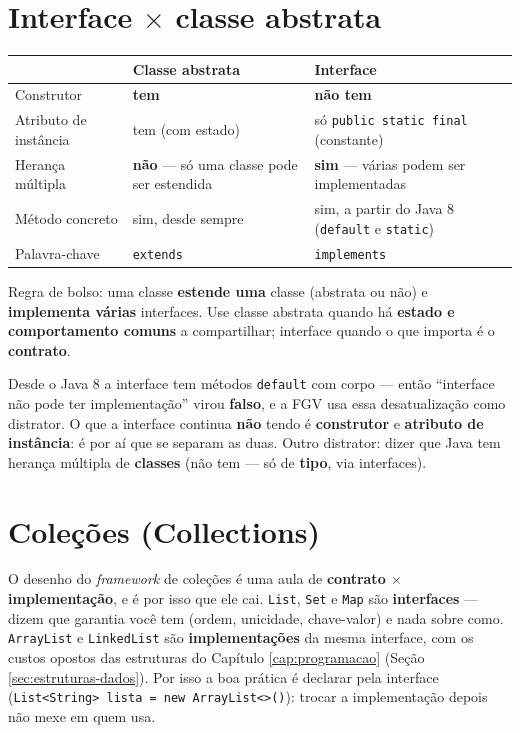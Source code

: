 \section{Interface $\times$ classe abstrata}

\begin{center}
\begin{tabular}{@{}p{3.2cm}p{4.2cm}p{4.2cm}@{}}
\toprule
& \textbf{Classe abstrata} & \textbf{Interface} \\
\midrule
Construtor & \textbf{tem} & \textbf{não tem} \\
Atributo de instância & tem (com estado) & só \texttt{public static final} (constante) \\
Herança múltipla & \textbf{não} --- só uma classe pode ser estendida & \textbf{sim} --- várias podem ser implementadas \\
Método concreto & sim, desde sempre & sim, a partir do Java 8 (\texttt{default} e \texttt{static}) \\
Palavra-chave & \texttt{extends} & \texttt{implements} \\
\bottomrule
\end{tabular}
\end{center}

Regra de bolso: uma classe \textbf{estende uma} classe (abstrata ou não) e
\textbf{implementa várias} interfaces. Use classe abstrata quando há
\textbf{estado e comportamento comuns} a compartilhar; interface quando o que
importa é o \textbf{contrato}.

\begin{pegadinha}
Desde o Java 8 a interface tem métodos \texttt{default} com corpo --- então
``interface não pode ter implementação'' virou \textbf{falso}, e a FGV usa
essa desatualização como distrator. O que a interface continua \textbf{não}
tendo é \textbf{construtor} e \textbf{atributo de instância}: é por aí que se
separam as duas. Outro distrator: dizer que Java tem herança múltipla de
\textbf{classes} (não tem --- só de \textbf{tipo}, via interfaces).
\end{pegadinha}

\section{Coleções (Collections)}

O desenho do \emph{framework} de coleções é uma aula de \textbf{contrato
$\times$ implementação}, e é por isso que ele cai. \texttt{List},
\texttt{Set} e \texttt{Map} são \textbf{interfaces} --- dizem que garantia você
tem (ordem, unicidade, chave-valor) e nada sobre como. \texttt{ArrayList} e
\texttt{LinkedList} são \textbf{implementações} da mesma interface, com os
custos opostos das estruturas do Capítulo \ref{cap:programacao} (Seção
\ref{sec:estruturas-dados}). Por isso a boa prática é declarar pela interface
(\texttt{List<String> lista = new ArrayList<>()}): trocar a implementação
depois não mexe em quem usa.

